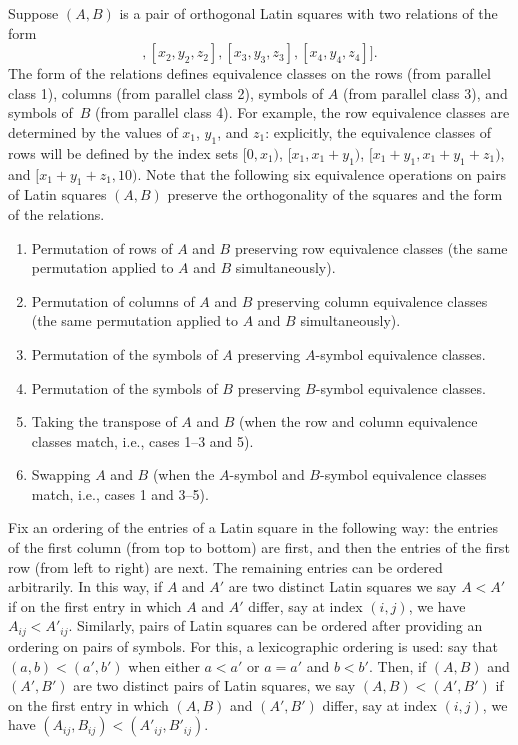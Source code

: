 \documentclass[runningheads]{llncs}
\begin{document}
Suppose $(A,B)$ is a pair of orthogonal Latin squares with two relations of the form
\begin{equation}
[[x_1,y_1,z_1],[x_2,y_2,z_2],[x_3,y_3,z_3],[x_4,y_4,z_4]] .
\end{equation}
The form of the relations defines equivalence classes on the rows (from parallel class 1), columns
(from parallel class 2), symbols of $A$ (from parallel class 3), and symbols of~$B$ (from parallel class 4).
For example, the row equivalence classes are determined by the values of $x_1$, $y_1$, and $z_1$:
explicitly, the equivalence classes of rows will be defined by the index sets $[0,x_1)$,
$[x_1,x_1+y_1)$, $[x_1+y_1,x_1+y_1+z_1)$, and $[x_1+y_1+z_1,10)$.
Note that the following six equivalence operations
on pairs of Latin squares $(A,B)$ preserve
the orthogonality of the squares and the form of the relations.
\begin{enumerate}
\item Permutation of rows of $A$ and $B$ preserving row equivalence classes (the same permutation applied to $A$ and $B$ simultaneously).
\item Permutation of columns of $A$ and $B$ preserving column equivalence classes (the same permutation applied to $A$ and $B$ simultaneously).
\item Permutation of the symbols of $A$ preserving $A$-symbol equivalence classes.
\item Permutation of the symbols of $B$ preserving $B$-symbol equivalence classes.
\item Taking the transpose of $A$ and $B$ (when the row and column equivalence classes match, i.e., cases 1--3 and 5).
\item Swapping $A$ and $B$ (when the $A$-symbol and $B$-symbol equivalence classes match, i.e., cases 1 and 3--5).
\end{enumerate}

Fix an ordering of the entries of a Latin square in the following way:
the entries of the first column (from top to bottom) are first, and then the entries of the
first row (from left to right) are next.  The remaining entries can be ordered arbitrarily.
In this way, if $A$ and $A'$ are two distinct Latin squares
we say $A<A'$ if on the first entry in which $A$ and $A'$ differ, say at
index $(i,j)$, we have $A_{ij}<A'_{ij}$.
Similarly, pairs of Latin squares can be ordered
after providing an ordering on pairs of symbols.
For this, a lexicographic ordering is used: say that $(a,b)<(a',b')$ when either $a<a'$ or $a=a'$ and $b<b'$.
Then, if $(A,B)$ and $(A',B')$ are two distinct pairs of Latin squares, we say
$(A,B)<(A',B')$ if on the first entry in which $(A,B)$ and $(A',B')$
differ, say at index $(i,j)$, we have $(A_{ij},B_{ij})<(A'_{ij},B'_{ij})$.
\end{document}

